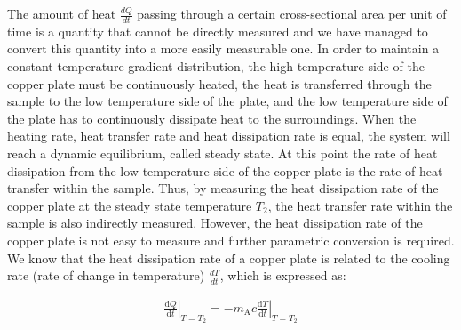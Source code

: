\documentclass[UTF8]{article}
\begin{document}
	The amount of heat $\frac{dQ}{dt} $ passing through a certain cross-sectional area per unit of time is a quantity that cannot be directly measured and we have managed to convert this quantity into a more easily measurable one. In order to maintain a constant temperature gradient distribution, the high temperature side of the copper plate must be continuously heated, the heat is transferred through the sample to the low temperature side of the plate, and the low temperature side of the plate has to continuously dissipate heat to the surroundings. When the heating rate, heat transfer rate and heat dissipation rate is equal, the system will reach a dynamic equilibrium, called steady state. At this point the rate of heat dissipation from the low temperature side of the copper plate is the rate of heat transfer within the sample. Thus, by measuring the heat dissipation rate of the copper plate at the steady state temperature $T_{2}$, the heat transfer rate within the sample is also indirectly measured. However, the heat dissipation rate of the copper plate is not easy to measure and further parametric conversion is required. We know that the heat dissipation rate of a copper plate is related to the cooling rate (rate of change in temperature) $\frac{dT}{dt} $, which is expressed as:
	
	\begin{eqnarray}\left. \frac{\text{d}Q}{\text{d}t} \right|_{T=T_2}=-\left. m_{\text{A}}c\frac{\text{d}T}{\text{d}t} \right|_{T=T_2} \end{eqnarray}
	
\end{document}
